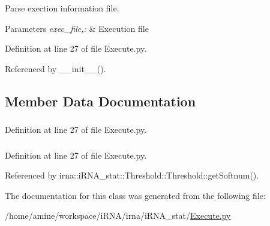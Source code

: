 \-Parse exection information file. 


\begin{DoxyParams}{\-Parameters}
{\em exec\-\_\-file,\-:} & \-Execution file \\
\hline
\end{DoxyParams}


\-Definition at line 27 of file \-Execute.\-py.



\-Referenced by \-\_\-\-\_\-init\-\_\-\-\_\-().



\subsection{\-Member \-Data \-Documentation}
\hypertarget{classirna_1_1iRNA__stat_1_1Execute_1_1Execute_abc5962030e61cd50b643e52032192700}{
\subsubsection[{duration}]{}}
\label{classirna_1_1iRNA__stat_1_1Execute_1_1Execute_abc5962030e61cd50b643e52032192700}


\-Definition at line 27 of file \-Execute.\-py.

\hypertarget{classirna_1_1iRNA__stat_1_1Execute_1_1Execute_aa82d61e47b9d558c2e1d38c8a0f3ac62}{
\subsubsection[{soft}]{}}
\label{classirna_1_1iRNA__stat_1_1Execute_1_1Execute_aa82d61e47b9d558c2e1d38c8a0f3ac62}


\-Definition at line 27 of file \-Execute.\-py.



\-Referenced by irna\-::i\-R\-N\-A\-\_\-stat\-::\-Threshold\-::\-Threshold\-::get\-Softnum().



\-The documentation for this class was generated from the following file\-:\begin{DoxyCompactItemize}
\item 
/home/amine/workspace/i\-R\-N\-A/irna/i\-R\-N\-A\-\_\-stat/\hyperlink{Execute_8py}{\-Execute.\-py}\end{DoxyCompactItemize}
